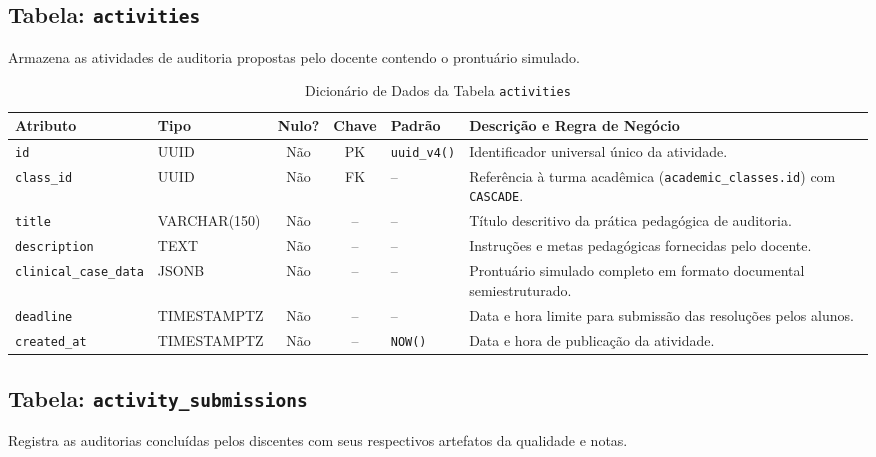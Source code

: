 \subsection{Tabela: \texttt{activities}}
Armazena as atividades de auditoria propostas pelo docente contendo o prontuário simulado.

\begin{table}[!ht]
\centering
\caption{Dicionário de Dados da Tabela \texttt{activities}}
\label{tab_dic_activities}
\footnotesize
\begin{tabularx}{\textwidth}{p{3.2cm} p{2.5cm} c c p{1.8cm} X}
\toprule
\textbf{Atributo} & \textbf{Tipo} & \textbf{Nulo?} & \textbf{Chave} & \textbf{Padrão} & \textbf{Descrição e Regra de Negócio} \\
\midrule
\texttt{id} & UUID & Não & PK & \texttt{uuid\_v4()} & Identificador universal único da atividade. \\
\texttt{class\_id} & UUID & Não & FK & -- & Referência à turma acadêmica (\texttt{academic\_classes.id}) com \texttt{CASCADE}. \\
\texttt{title} & VARCHAR(150) & Não & -- & -- & Título descritivo da prática pedagógica de auditoria. \\
\texttt{description} & TEXT & Não & -- & -- & Instruções e metas pedagógicas fornecidas pelo docente. \\
\texttt{clinical\_\-case\_\-data} & JSONB & Não & -- & -- & Prontuário simulado completo em formato documental semiestruturado. \\
\texttt{deadline} & TIMESTAMPTZ & Não & -- & -- & Data e hora limite para submissão das resoluções pelos alunos. \\
\texttt{created\_at} & TIMESTAMPTZ & Não & -- & \texttt{NOW()} & Data e hora de publicação da atividade. \\
\bottomrule
\end{tabularx}
\end{table}

\subsection{Tabela: \texttt{activity\_submissions}}
Registra as auditorias concluídas pelos discentes com seus respectivos artefatos da qualidade e notas.

